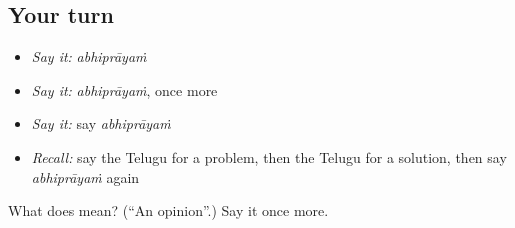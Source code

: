 \subsection*{Your turn}
\begin{itemize}
\raggedright
  \item \emph{Say it:} \emph{abhiprāyaṁ}
  \item \emph{Say it:} \emph{abhiprāyaṁ}, once more
  \item \emph{Say it:} say \emph{abhiprāyaṁ}
  \item \emph{Recall:} say the Telugu for a problem, then the Telugu for a solution, then say \emph{abhiprāyaṁ} again
\end{itemize}

\begin{tcolorbox}[breakable,colback=teal!4,colframe=teal!35!black,title={Before you move on}]
What does  mean? (\textquotedblleft{}An opinion\textquotedblright{}.) Say it once more.
\end{tcolorbox}
